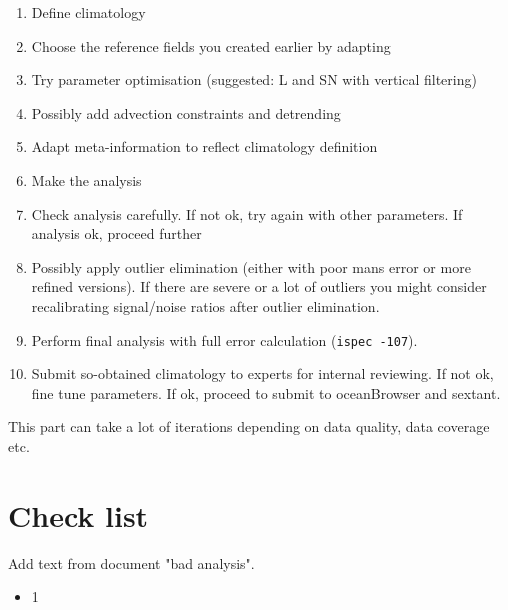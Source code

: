 \documentclass[a4paper,12pt,oneside,notitlepage]{book}
\newcommand{\file}[1]{\texttt{\color{MidnightBlue}{#1}}}
\newcommand{\command}[1]{\texttt{\color{RedOrange}{#1}}}
\begin{document}
\begin{enumerate}
\item Define climatology \file{yearlist, monthlist, varlist}
\item Choose the reference fields you created earlier by adapting \file{constandrefe}
\item Try parameter optimisation (suggested: L and SN with vertical filtering)
\item Possibly add advection constraints and detrending
\item Adapt meta-information to reflect climatology definition
\item Make the analysis
\item Check analysis carefully. If not ok, try again with other parameters. If analysis ok, proceed further
\item Possibly apply outlier elimination (either with poor mans error or more refined versions). If there are severe or a lot of outliers you might consider recalibrating signal/noise ratios after outlier elimination.

\item Perform final analysis with full error calculation ({\tt ispec -107}).
\item Submit so-obtained climatology to experts for internal reviewing. If not ok, fine tune parameters. If ok, proceed to submit to oceanBrowser and sextant.
\end{enumerate}


This part can take a lot of iterations depending on data quality, data coverage etc.


\section{Check list}

Add text from document "bad analysis".

\begin{itemize}
\item[\checkmark] 1
\end{itemize}





\end{document}
